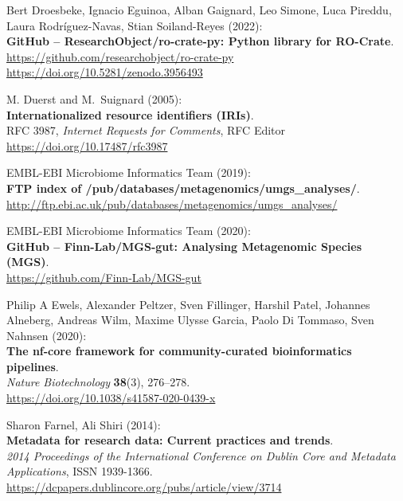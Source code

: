 \begin{thebibliography}{9}
Bert Droesbeke, Ignacio Eguinoa, Alban Gaignard, Leo Simone,
Luca Pireddu, Laura Rodríguez-Navas, Stian Soiland-Reyes (2022):\\
\textbf{GitHub -- ResearchObject/ro-crate-py: Python library for
RO-Crate}.\\
\url{https://github.com/researchobject/ro-crate-py}\\
\url{https://doi.org/10.5281/zenodo.3956493}

M. Duerst and M.~Suignard (2005):\\
\textbf{Internationalized resource identifiers (IRIs)}.\\
RFC 3987, \emph{Internet Requests for Comments}, RFC Editor\\
\url{https://doi.org/10.17487/rfc3987}

EMBL-EBI Microbiome Informatics Team (2019):\\
\textbf{FTP index of /pub/databases/metagenomics/umgs\_analyses/}.\\
\url{http://ftp.ebi.ac.uk/pub/databases/metagenomics/umgs_analyses/}

EMBL-EBI Microbiome Informatics Team (2020):\\
\textbf{GitHub -- Finn-Lab/MGS-gut: Analysing Metagenomic Species
(MGS)}.\\
\url{https://github.com/Finn-Lab/MGS-gut}

Philip A Ewels, Alexander Peltzer, Sven Fillinger, Harshil
Patel, Johannes Alneberg, Andreas Wilm, Maxime Ulysse Garcia, Paolo Di
Tommaso, Sven Nahnsen (2020):\\
\textbf{The nf-core framework for community-curated bioinformatics
pipelines}.\\
\emph{Nature Biotechnology} \textbf{38}(3), 276--278.\\
\url{https://doi.org/10.1038/s41587-020-0439-x}

Sharon Farnel, Ali Shiri (2014):\\
\textbf{Metadata for research data: Current practices and trends}.\\
\emph{2014 Proceedings of the International Conference on Dublin Core
and Metadata Applications}, ISSN 1939-1366.\\
\url{https://dcpapers.dublincore.org/pubs/article/view/3714}


\end{thebibliography}
